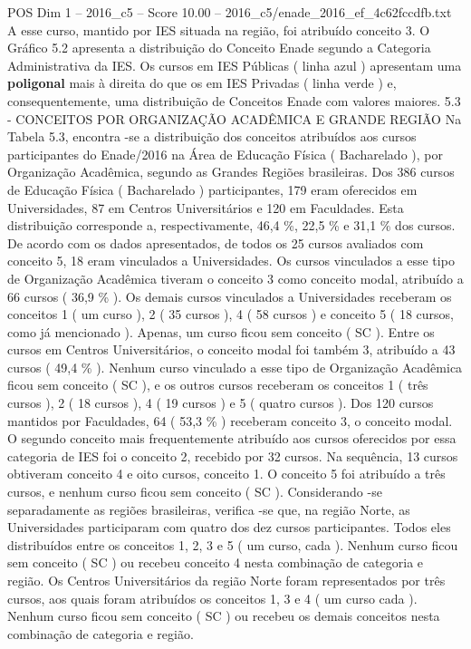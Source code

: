 \begin{textsample}{POS Dim 1 – 2016\_c5 – Score 10.00 – 2016\_c5/enade\_2016\_ef\_4c62fccdfb.txt}
A esse curso, mantido por IES situada na região, foi atribuído conceito 3.
O Gráfico 5.2 apresenta a distribuição do Conceito Enade segundo a Categoria Administrativa da IES.
Os cursos em IES Públicas ( linha azul ) apresentam uma \textbf{poligonal} mais à direita do que os em IES Privadas ( linha verde ) e, consequentemente, uma distribuição de Conceitos Enade com valores maiores. 5.3 - CONCEITOS POR ORGANIZAÇÃO ACADÊMICA E GRANDE REGIÃO Na Tabela 5.3, encontra -se a distribuição dos conceitos atribuídos aos cursos participantes do Enade/2016 na Área de Educação Física ( Bacharelado ), por Organização Acadêmica, segundo as Grandes Regiões brasileiras.
Dos 386 cursos de Educação Física ( Bacharelado ) participantes, 179 eram oferecidos em Universidades, 87 em Centros Universitários e 120 em Faculdades.
Esta distribuição corresponde a, respectivamente, 46,4 \%, 22,5 \% e 31,1 \% dos cursos.
De acordo com os dados apresentados, de todos os 25 cursos avaliados com conceito 5, 18 eram vinculados a Universidades.
Os cursos vinculados a esse tipo de Organização Acadêmica tiveram o conceito 3 como conceito modal, atribuído a 66 cursos ( 36,9 \% ).
Os demais cursos vinculados a Universidades receberam os conceitos 1 ( um curso ), 2 ( 35 cursos ), 4 ( 58 cursos ) e conceito 5 ( 18 cursos, como já mencionado ).
Apenas, um curso ficou sem conceito ( SC ).
Entre os cursos em Centros Universitários, o conceito modal foi também 3, atribuído a 43 cursos ( 49,4 \% ).
Nenhum curso vinculado a esse tipo de Organização Acadêmica ficou sem conceito ( SC ), e os outros cursos receberam os conceitos 1 ( três cursos ), 2 ( 18 cursos ), 4 ( 19 cursos ) e 5 ( quatro cursos ).
Dos 120 cursos mantidos por Faculdades, 64 ( 53,3 \% ) receberam conceito 3, o conceito modal.
O segundo conceito mais frequentemente atribuído aos cursos oferecidos por essa categoria de IES foi o conceito 2, recebido por 32 cursos.
Na sequência, 13 cursos obtiveram conceito 4 e oito cursos, conceito 1.
O conceito 5 foi atribuído a três cursos, e nenhum curso ficou sem conceito ( SC ).
Considerando -se separadamente as regiões brasileiras, verifica -se que, na região Norte, as Universidades participaram com quatro dos dez cursos participantes.
Todos eles distribuídos entre os conceitos 1, 2, 3 e 5 ( um curso, cada ).
Nenhum curso ficou sem conceito ( SC ) ou recebeu conceito 4 nesta combinação de categoria e região.
Os Centros Universitários da região Norte foram representados por três cursos, aos quais foram atribuídos os conceitos 1, 3 e 4 ( um curso cada ).
Nenhum curso ficou sem conceito ( SC ) ou recebeu os demais conceitos nesta combinação de categoria e região.

\end{textsample}

